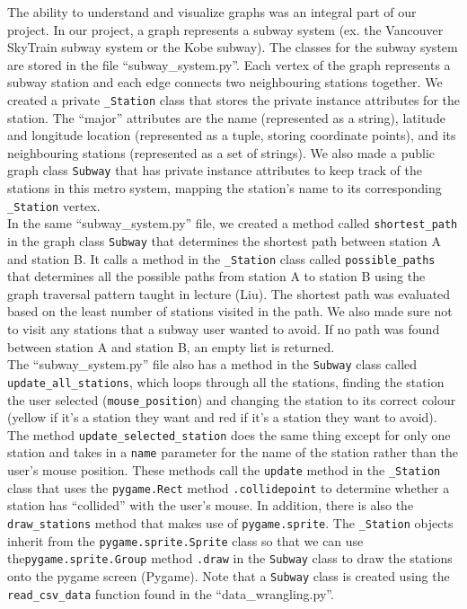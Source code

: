 \documentclass[fontsize=11pt]{article}
\begin{document}
The ability to understand and visualize graphs was an integral part of our project. In our project, a graph represents a subway system (ex. the Vancouver SkyTrain subway system or the Kobe subway). The classes for the subway system are stored in the file ``subway\_system.py”. Each vertex of the graph represents a subway station and each edge connects two neighbouring stations together. We created a private \texttt{\_Station} class that stores the private instance attributes for the station. The ``major” attributes are the name (represented as a string), latitude and longitude location (represented as a tuple, storing coordinate points), and its neighbouring stations (represented as a set of strings). We also made a public graph class \texttt{Subway} that has private instance attributes to keep track of the stations in this metro system, mapping the station’s name to its corresponding \texttt{\_Station} vertex. \\

In the same ``subway\_system.py” file, we created a method called \texttt{shortest\_path} in the graph class \texttt{Subway} that determines the shortest path between station A and station B. It calls a method in the \texttt{\_Station} class called \texttt{possible\_paths} that determines all the possible paths from station A to station B using the graph traversal pattern taught in lecture (Liu). The shortest path was evaluated based on the least number of stations visited in the path. We also made sure not to visit any stations that a subway user wanted to avoid. If no path was found between station A and station B, an empty list is returned. \\

The ``subway\_system.py” file also has a method in the \texttt{Subway} class called \texttt{update\_all\_stations}, which loops through all the stations, finding the station the user selected (\texttt{mouse\_position}) and changing the station to its correct colour (yellow if it’s a station they want and red if it’s a station they want to avoid). The method \texttt{update\_selected\_station} does the same thing except for only one station and takes in a \texttt{name} parameter for the name of the station rather than the user’s mouse position. These methods call the \texttt{update} method in the \texttt{\_Station} class that uses the \texttt{pygame.Rect} method \texttt{.collidepoint} to determine whether a station has ``collided” with the user’s mouse. In addition, there is also the \texttt{draw\_stations} method that makes use of \texttt{pygame.sprite}. The \texttt{\_Station} objects inherit from the \texttt{pygame.sprite.Sprite} class so that we can use the\texttt{pygame.sprite.Group} method \texttt{.draw} in the \texttt{Subway} class to draw the stations onto the pygame screen (Pygame). Note that a \texttt{Subway} class is created using the \texttt{read\_csv\_data} function found in the ``data\_wrangling.py”. \\
\end{document}
